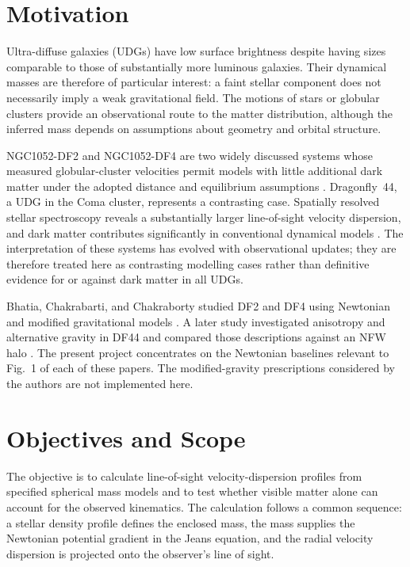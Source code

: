 \documentclass[12pt,a4paper]{report}
\numberwithin{equation}{chapter}
\begin{document}
\section{Motivation}

Ultra-diffuse galaxies (UDGs) have low surface brightness despite having sizes comparable to those of substantially more luminous galaxies. Their dynamical masses are therefore of particular interest: a faint stellar component does not necessarily imply a weak gravitational field. The motions of stars or globular clusters provide an observational route to the matter distribution, although the inferred mass depends on assumptions about geometry and orbital structure.

NGC1052-DF2 and NGC1052-DF4 are two widely discussed systems whose measured globular-cluster velocities permit models with little additional dark matter under the adopted distance and equilibrium assumptions \cite{vandokkum2018,vandokkumdf4_2019}. Dragonfly~44, a UDG in the Coma cluster, represents a contrasting case. Spatially resolved stellar spectroscopy reveals a substantially larger line-of-sight velocity dispersion, and dark matter contributes significantly in conventional dynamical models \cite{vandokkumdf44_2019}. The interpretation of these systems has evolved with observational updates; they are therefore treated here as contrasting modelling cases rather than definitive evidence for or against dark matter in all UDGs.

Bhatia, Chakrabarti, and Chakraborty studied DF2 and DF4 using Newtonian and modified gravitational models \cite{bhatia2023}. A later study investigated anisotropy and alternative gravity in DF44 and compared those descriptions against an NFW halo \cite{bhatia2024}. The present project concentrates on the Newtonian baselines relevant to Fig.~1 of each of these papers. The modified-gravity prescriptions considered by the authors are not implemented here.

\section{Objectives and Scope}

The objective is to calculate line-of-sight velocity-dispersion profiles from specified spherical mass models and to test whether visible matter alone can account for the observed kinematics. The calculation follows a common sequence: a stellar density profile defines the enclosed mass, the mass supplies the Newtonian potential gradient in the Jeans equation, and the radial velocity dispersion is projected onto the observer's line of sight.
\end{document}
